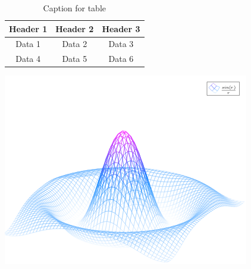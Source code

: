 \documentclass{article}
\begin{document}
\begin{table}[ht]
\centering
\begin{tabular}{c|c|c}
\hline
Header 1 & Header 2 & Header 3 \\
\hline
Data 1 & Data 2 & Data 3 \\
Data 4 & Data 5 & Data 6 \\
\hline
\end{tabular}
\caption{Caption for table}
\label{{table:your_label_here}}
\end{table}

\includegraphics{mesh}
\end{document}
